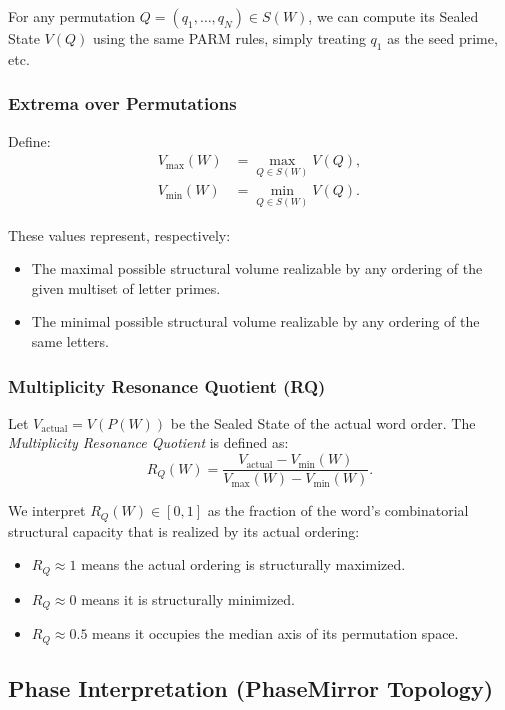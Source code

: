 \documentclass[11pt]{article}
\begin{document}
For any permutation $Q = (q_1,\dots,q_N) \in S(W)$, we can compute its Sealed State $V(Q)$ using the same PARM rules, simply treating $q_1$ as the seed prime, etc.

\subsubsection{Extrema over Permutations}

Define:
\begin{align}
V_{\max}(W) &= \max_{Q \in S(W)} V(Q), \\
V_{\min}(W) &= \min_{Q \in S(W)} V(Q).
\end{align}

These values represent, respectively:
\begin{itemize}
    \item The maximal possible structural volume realizable by any ordering of the given multiset of letter primes.
    \item The minimal possible structural volume realizable by any ordering of the same letters.
\end{itemize}

\subsubsection{Multiplicity Resonance Quotient (RQ)}

Let $V_{\text{actual}} = V(P(W))$ be the Sealed State of the actual word order. The \emph{Multiplicity Resonance Quotient} is defined as:
\[
R_Q(W) = \frac{V_{\text{actual}} - V_{\min}(W)}{V_{\max}(W) - V_{\min}(W)}.
\]

We interpret $R_Q(W) \in [0,1]$ as the fraction of the word's combinatorial structural capacity that is realized by its actual ordering:
\begin{itemize}
    \item $R_Q \approx 1$ means the actual ordering is structurally maximized.
    \item $R_Q \approx 0$ means it is structurally minimized.
    \item $R_Q \approx 0.5$ means it occupies the median axis of its permutation space.
\end{itemize}

\subsection{Phase Interpretation (PhaseMirror Topology)}
\end{document}
